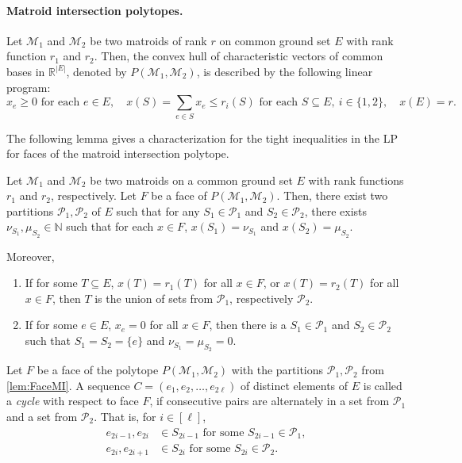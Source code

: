 \documentclass[11pt]{article}
\begin{document}
\paragraph{Matroid intersection polytopes.}
Let $\mathcal{M}_1$ and $\mathcal{M}_2$ be two matroids of rank $r$ on common ground set $E$ with rank function $r_1$ and $r_2$. Then, the convex hull of characteristic vectors of common bases in $\mathbb{R}^{|E|}$, denoted by $P(\mathcal{M}_1,\mathcal{M}_2)$, is described by the following linear program:
\[
x_e\geq 0 \text{ for each } e\in E, \quad
x(S)=\sum_{e\in S}x_e\leq r_i(S) \text{ for each } S\subseteq E,\ i\in \{1,2\}, \quad
x(E)=r.
\]

The following lemma \cite[Lemma~3.5]{DBLP:journals/cc/GurjarT20} gives a characterization for the tight inequalities in the LP for faces of the matroid intersection polytope.
\begin{lemma}\label{lem:FaceMI}
Let $\mathcal{M}_1$ and $\mathcal{M}_2$ be two matroids on a common ground set $E$ with rank functions $r_1$ and $r_2$, respectively. Let $F$ be a face of $P(\mathcal{M}_1,\mathcal{M}_2)$. Then, there exist two partitions $\mathcal{P}_1,\mathcal{P}_2$ of $E$ such that for any $S_1\in \mathcal{P}_1$ and $S_2\in \mathcal{P}_2$, there exists $\nu_{S_1},\mu_{S_2}\in \mathbb{N}$ such that for each $x\in F$, $x(S_1)=\nu_{S_1}$ and $x(S_2)=\mu_{S_2}$.

Moreover,\begin{enumerate}
    \item If for some $T\subseteq E$, $x(T)=r_1(T)$ for all $x\in F$, or $x(T)=r_2(T)$ for all $x\in F$, then $T$ is the union of sets from $\mathcal{P}_1$, respectively $\mathcal{P}_2$.
    \item If for some $e\in E$, $x_e=0 $ for all $x\in F$, then  there is a $S_1\in \mathcal{P}_1$ and $S_2\in \mathcal{P}_2$ such that $S_1=S_2=\{e\}$ and $\nu_{S_1}=\mu_{S_2}=0$.
\end{enumerate}
\end{lemma}

\begin{definition}\label{def:cycle}
Let $F$ be a face of the polytope $P(\mathcal{M}_1,\mathcal{M}_2)$ with the partitions $\mathcal{P}_1,\mathcal{P}_2$  from \cref{lem:FaceMI}. A sequence
$C = (e_1,e_2,\dots,e_{2\ell})$ of distinct elements of $E$ is called a \emph{cycle}
with respect to face $F$, if consecutive pairs are alternately in a set
from $\mathcal{P}_1$ and a set from $\mathcal{P}_2$. That is, for $i \in [\ell]$,
\begin{align*}
      e_{2i-1},e_{2i} &\in S_{2i-1} \text{ for some } S_{2i-1} \in \mathcal{P}_1, \\
      e_{2i},e_{2i+1} &\in S_{2i} \text{ for some } S_{2i}\in \mathcal{P}_2.
\end{align*}
\end{definition}
\end{document}
